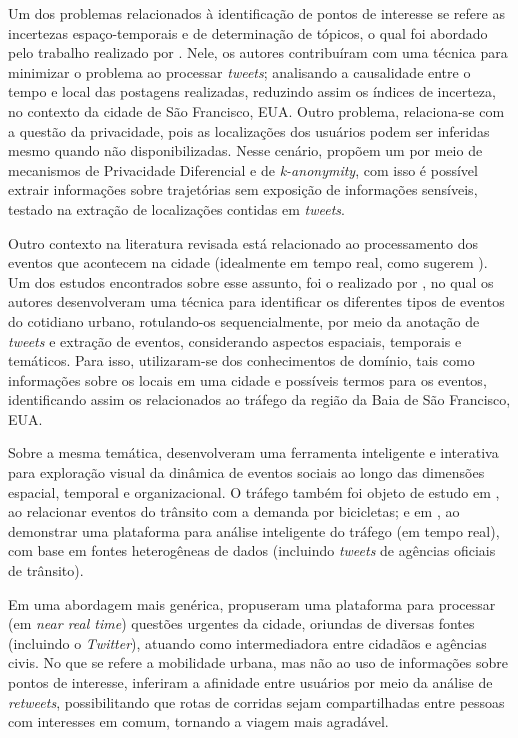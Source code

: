 \documentclass[
	12pt,				%
	oneside,			%
	a4paper,			%
	english,			%
	brazil				%
	]{abntex2ppgsi}
\begin{document}
{{{Um dos problemas relacionados à identificação de pontos de interesse se refere as incertezas espaço-temporais e de determinação de tópicos, o qual foi abordado pelo trabalho realizado por \cite{Bendler2014}. Nele, os autores contribuíram com uma técnica para minimizar o problema ao processar \textit{tweets}; analisando a causalidade entre o tempo e local das postagens realizadas, reduzindo assim os índices de incerteza, no contexto da cidade de São Francisco, EUA. Outro problema, relaciona-se com a questão da privacidade, pois as localizações dos usuários podem ser inferidas mesmo quando não disponibilizadas. Nesse cenário, \cite{Wang2017} propõem um  por meio de mecanismos de Privacidade Diferencial e de \textit{k-anonymity}, com isso é possível extrair informações sobre trajetórias sem exposição de informações sensíveis, testado na extração de localizações contidas em \textit{tweets}. 

Outro contexto na literatura revisada está relacionado ao processamento dos eventos que acontecem na cidade (idealmente em tempo real, como sugerem \cite{Soomro2016}). Um dos estudos encontrados sobre esse assunto, foi o realizado por \cite{Anantharam2015}, no qual os autores desenvolveram uma técnica para identificar os diferentes tipos de eventos do cotidiano urbano, rotulando-os sequencialmente, por meio da anotação de \textit{tweets} e extração de eventos, considerando aspectos espaciais, temporais e temáticos. Para isso, utilizaram-se dos conhecimentos de domínio, tais como informações sobre os locais em uma cidade e possíveis termos para os eventos, identificando assim os relacionados ao tráfego da região da Baia de São Francisco, EUA. 

Sobre a mesma temática, \cite{DiLorenzo2013} desenvolveram uma ferramenta inteligente e interativa para exploração visual da dinâmica de eventos sociais ao longo das dimensões espacial, temporal e organizacional. O tráfego também foi objeto de estudo em \cite{Chen2016}, ao relacionar eventos do trânsito com a demanda por bicicletas; e em \cite{Lecue2014}, ao demonstrar uma plataforma para análise inteligente do tráfego (em tempo real), com base em fontes heterogêneas de dados (incluindo \textit{tweets} de agências oficiais de trânsito).

Em uma abordagem mais genérica, \cite{Mukherjee2015} propuseram uma plataforma para processar (em \textit{near real time}) questões urgentes da cidade, oriundas de diversas fontes (incluindo o \textit{Twitter}), atuando como intermediadora entre cidadãos e agências civis. No que se refere a mobilidade urbana, mas não ao uso de informações sobre pontos de interesse, \cite{Yousaf2014} inferiram a afinidade entre usuários por meio da análise de \textit{retweets}, possibilitando que rotas de corridas sejam compartilhadas entre pessoas com interesses em comum, tornando a viagem mais agradável.

}}}
\end{document}
